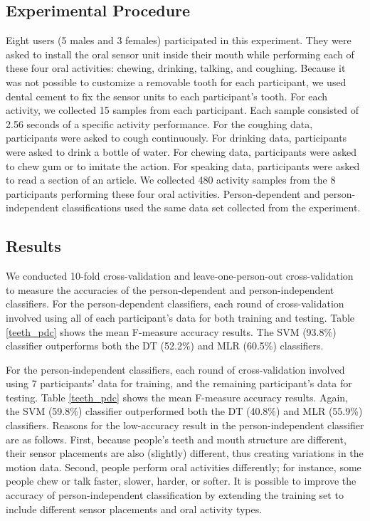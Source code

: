 \subsection{Experimental Procedure}
Eight users (5 males and 3 females) participated in this experiment. They were asked to install the oral sensor unit inside their mouth while performing each of these four oral activities: chewing, drinking, talking, and coughing. Because it was not possible to customize a removable tooth for each participant, we used dental cement to fix the sensor units to each participant's tooth. For each activity, we collected 15 samples from each participant. Each sample consisted of 2.56 seconds of a specific activity performance. For the coughing data, participants were asked to cough continuously. For drinking data, participants were asked to drink a bottle of water. For chewing data, participants were asked to chew gum or to imitate the action. For speaking data, participants were asked to read a section of an article. We collected 480 activity samples from the 8 participants performing these four oral activities. Person-dependent and person-independent classifications used the same data set collected from the experiment.

\subsection{Results}
We conducted 10-fold cross-validation and leave-one-person-out cross-validation to measure the accuracies of the person-dependent and person-independent classifiers. For the person-dependent classifiers, each round of cross-validation involved using all of each participant's data for both training and testing. Table \ref{teeth_pdc} shows the mean F-measure accuracy results. The SVM (93.8\%) classifier outperforms both the DT (52.2\%) and MLR (60.5\%) classifiers.  

For the person-independent classifiers, each round of cross-validation involved using 7 participants' data for training, and the remaining participant's data for testing. Table \ref{teeth_pdc} shows the mean F-measure accuracy results. Again, the SVM (59.8\%) classifier outperformed both the DT (40.8\%) and MLR (55.9\%) classifiers. Reasons for the low-accuracy result in the person-independent classifier are as follows.
First, because people's teeth and mouth structure are different, their sensor placements are also (slightly) different, thus creating variations in the motion data. Second, people perform oral activities differently; for instance, some people chew or talk faster, slower, harder, or softer. It is possible to improve the accuracy of person-independent classification by extending the training set to include different sensor placements and oral activity types.
\newpage

